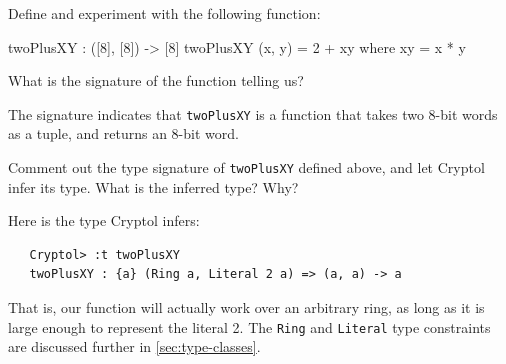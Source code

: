 \begin{Exercise}\label{ex:fn:1}
Define and experiment with the following function:
\begin{code}
  twoPlusXY : ([8], [8]) -> [8]
  twoPlusXY (x, y) = 2 + xy
     where xy = x * y
\end{code}
What is the signature of the function telling us?
\end{Exercise}
\begin{Answer}
  The signature indicates that {\tt twoPlusXY} is a function that
  takes two 8-bit words as a tuple, and returns an 8-bit word.
\end{Answer}

\begin{Exercise}\label{ex:fn:1.1}
  Comment out the type signature of {\tt twoPlusXY} defined above, and
  let Cryptol infer its type. What is the inferred type? Why?
\end{Exercise}
\begin{Answer}
Here is the type Cryptol infers:
\begin{verbatim}
   Cryptol> :t twoPlusXY
   twoPlusXY : {a} (Ring a, Literal 2 a) => (a, a) -> a
\end{verbatim}
That is, our function will actually work over an arbitrary ring, as
long as it is large enough to represent the literal 2. The
\texttt{Ring} and \texttt{Literal} type constraints are discussed
further in \autoref{sec:type-classes}.
\end{Answer}

